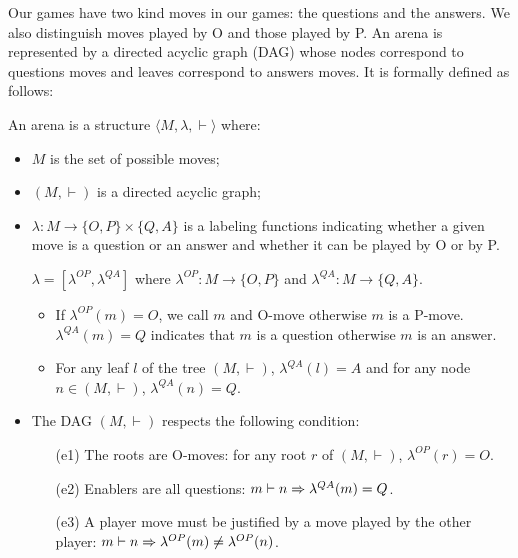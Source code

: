 Our games have two kind moves in our games: the questions and the answers.
We also distinguish moves played by O and those played by P.
An arena is represented by a directed acyclic graph (DAG) whose nodes correspond
to questions moves and leaves correspond to answers moves.
It is formally defined as follows:
\begin{dfn}[Arena]
An arena is a structure $\langle M, \lambda, \vdash \rangle$ where:
\begin{itemize}
\item $M$ is the set of possible moves;
\item $(M,\vdash)$ is a directed acyclic graph;

\item $\lambda : M \rightarrow \{ O, P\} \times \{Q, A\}$ is a labeling functions indicating whether a given move
    is a question or an answer and whether it can be played by O or by P.

    $\lambda = [\lambda^{OP},\lambda^{QA}]$ where $\lambda^{OP} : M \rightarrow  \{ O, P\}$
    and $\lambda^{QA} : M \rightarrow  \{ Q, A\}$.

    \begin{itemize}
    \item If $\lambda^{OP} (m) = O$, we call $m$ and O-move otherwise $m$ is a P-move.
    $\lambda^{QA} (m) = Q$ indicates that $m$ is a question otherwise $m$ is an answer.

    \item For any leaf $l$ of the tree $(M,\vdash)$, $\lambda^{QA} (l) = A$ and for any node
    $n \in (M,\vdash)$, $\lambda^{QA} (n) = Q$.
    \end{itemize}

\item The DAG $(M,\vdash)$ respects the following condition:
    \begin{itemize}
    \item[(e1)] The roots are O-moves: for any root $r$ of $(M,\vdash)$, $\lambda^{OP} (r) = O$.
    \item[(e2)] Enablers are all questions: $m \vdash n  \Rightarrow \lambda^{QA}(m) = Q$.
    \item[(e3)] A player move must be justified by a move played by the other player:
         $m\vdash n \Rightarrow \lambda^{OP}(m) \neq \lambda^{OP}(n)$.
    \end{itemize}
\end{itemize}
\end{dfn}

